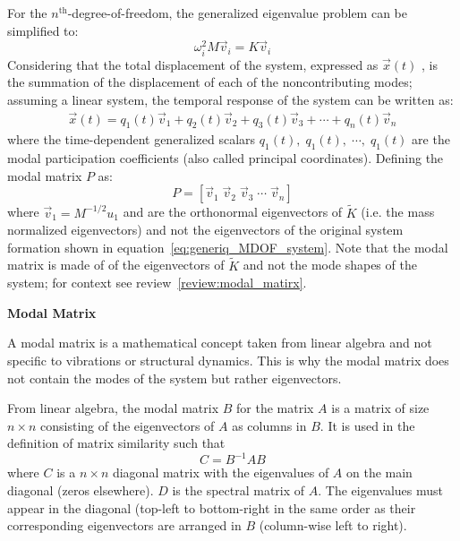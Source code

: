 \documentclass[12pt,letter]{article}
\begin{document}
	For the $n^{\text{th}}$-degree-of-freedom, the generalized eigenvalue problem can be simplified to: 
	\begin{equation}
	\omega_i^2 M \vec{v}_i = K  \vec{v}_i
	\end{equation}
	Considering that the total displacement of the system, expressed as $\vec{x}(t)$ , is the summation of the displacement of each of the noncontributing modes; assuming a linear system, the temporal response of the system can be written as:
	\begin{eqnarray}
	\vec{x}(t) = q_1(t) \vec{v}_1 + q_2(t) \vec{v}_2 + q_3(t) \vec{v}_3 + \cdots + q_n(t) \vec{v}_n
	\label{eq:combination_of_modes}
	\end{eqnarray}
	\noindent where the time-dependent generalized scalars $q_1(t), \; q_1(t), \; \cdots, \; q_1(t)$ are the modal participation coefficients (also called principal coordinates). Defining the modal matrix $P$ as: 
	\begin{equation}
	P = [ \vec{v}_1 \;  \vec{v}_2 \;  \vec{v}_3 \; \cdots \; \vec{v}_n]
	\end{equation}
	where $\vec{v}_1 = M^{-1/2}u_1$ and are the orthonormal eigenvectors of $\tilde{K}$ (i.e. the mass normalized eigenvectors) and not the eigenvectors of the original system formation shown in equation~\ref{eq:generiq_MDOF_system}. Note that the modal matrix is made of of the eigenvectors of $\tilde{K}$ and not the mode shapes of the system; for context see review~\ref{review:modal_matirx}.

		\begin{review}	
		\label{review:modal_matirx}
		\textbf{Modal Matrix} 

		\noindent A modal matrix is a mathematical concept taken from linear algebra and not specific to vibrations or structural dynamics. This is why the modal matrix does not contain the modes of the system but rather eigenvectors. 
			
			From linear algebra, the modal matrix $B$ for the matrix $A$ is a matrix of size $n \times n$ consisting of the eigenvectors of $A$ as columns in $B$. It is used in the definition of matrix similarity such that 
			\begin{equation}
			C = B^{-1}AB
			\end{equation}
			where $C$ is a $n \times n$ diagonal matrix with the eigenvalues of $A$ on the main diagonal (zeros elsewhere). $D$ is the spectral matrix of $A$. The eigenvalues must appear in the diagonal (top-left to bottom-right in the same order as their corresponding eigenvectors are arranged in $B$ (column-wise left to right).			
		\end{review}	
	
\end{document}
